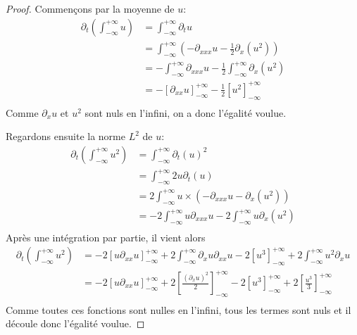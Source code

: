 \documentclass[12pt,a4paper]{article}
\numberwithin{equation}{section}
\begin{document}
\begin{proof}
    Commençons par la moyenne de $u$:
    \begin{equation*}
        \begin{split}
            \partial_t\left(\int_{-\infty}^{+\infty}u\right) &= \int_{-\infty}^{+\infty}\partial_tu\\
            &= \int_{-\infty}^{+\infty}\left(-\partial_{xxx}u -\frac{1}{2}\partial_x(u^2)\right)\\
            &= -\int_{-\infty}^{+\infty}\partial_{xxx}u -\frac{1}{2}\int_{-\infty}^{+\infty}\partial_x(u^2)\\
            &= -\left[\partial_{xx}u\right]_{-\infty}^{+\infty} -\frac{1}{2}\left[u^2\right]_{-\infty}^{+\infty}\\
        \end{split}
    \end{equation*}
    Comme $\partial_xu$ et $u^2$ sont nuls en l'infini, on a donc l'égalité voulue.

    Regardons ensuite la norme $L^2$ de $u$:
    \begin{equation*}
        \begin{split}
            \partial_t\left(\int_{-\infty}^{+\infty}u^2\right) &= \int_{-\infty}^{+\infty}\partial_t(u)^2\\
            &= \int_{-\infty}^{+\infty}2u\partial_t(u)\\
            &= 2\int_{-\infty}^{+\infty}u\times\left(-\partial_{xxx}u -\partial_x(u^2)\right)\\
            &= -2\int_{-\infty}^{+\infty}u\partial_{xxx}u -2\int_{-\infty}^{+\infty}u\partial_x(u^2)\\
        \end{split}
    \end{equation*}
    Après une intégration par partie, il vient alors
    \begin{equation*}
        \begin{split}
            \partial_t\left(\int_{-\infty}^{+\infty}u^2\right)
            &= -2\left[u\partial_{xx}u\right]_{-\infty}^{+\infty} + 2\int_{-\infty}^{+\infty}\partial_xu\partial_{xx}u -2\left[u^3\right]_{-\infty}^{+\infty} +2\int_{-\infty}^{+\infty}u^2\partial_xu\\
            &= -2\left[u\partial_{xx}u\right]_{-\infty}^{+\infty} + 2\left[\frac{(\partial_{x}u)^2}{2}\right]_{-\infty}^{+\infty} -2\left[u^3\right]_{-\infty}^{+\infty} + 2\left[\frac{u^3}{3}\right]_{-\infty}^{+\infty}\\
        \end{split}
    \end{equation*}
    Comme toutes ces fonctions sont nulles en l'infini, tous les termes sont nuls et il découle donc l'égalité voulue.


\end{proof}
\end{document}
